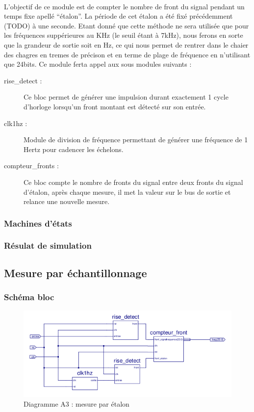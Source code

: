 \documentclass[a4paper,11pt]{article}
\begin{document}
\paragraph{} L'objectif de ce module est de compter le nombre de front du signal pendant un temps fixe apellé ``étalon''.
La période de cet étalon a été fixé précédemment (TODO) à une seconde. Etant donné que cette méthode ne sera utilisée que pour les 
fréquences suppérieures au KHz (le seuil étant à 7kHz), nous ferons en sorte que la grandeur de sortie soit en Hz, ce qui nous permet 
de rentrer dans le chaier des chagres en tremes de précison et en terme de plage de fréquence en n'utilisant que 24bits. Ce module 
ferta appel aux sous modules suivants :

\begin{description}
  \item[rise_detect : ] Ce bloc permet de générer une impulsion durant exactement 1 cycle d'horloge lorsqu'un front montant est détecté
  sur son entrée.
  \item[clk1hz : ] Module de division de fréquence permettant de générer une fréquence de 1 Hertz pour cadencer les échelons.
  \item[compteur_fronts : ] Ce bloc compte le nombre de fronts du signal entre deux fronts du signal d'étalon, après chaque mesure,
  il met la valeur sur le bus de sortie et relance une nouvelle mesure.
\end{description}


  \subsubsection{Machines d'états}
  \subsubsection{Résulat de simulation}

  \subsection{Mesure par échantillonnage}
  \subsubsection{Schéma bloc}
  
  \begin{figure}[H]
\begin{center}
	\includegraphics[scale=1]{sch-etalon.png}
	\caption{Diagramme A3 : mesure par étalon}
\end{center}
\end{figure}
\end{document}
